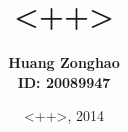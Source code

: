 \documentclass[12pt,a4paper]{article}
\begin{document}


\title{\textbf {<++>}}
\author{\textbf{Huang Zonghao}\\ 
\textbf{ID: 20089947}}
\date{<++>, 2014}

 
\maketitle
 

 
\end{document}
